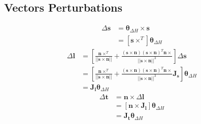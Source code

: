 \subsection{Vectors Perturbations}
\begin{equation}
    \begin{split}
        \Delta \mathbf{s} &= \boldsymbol{\theta}_{\Delta H} \times \mathbf{s}\\
        &= \left[\mathbf{s} \times ^T\right] \boldsymbol{\theta}_{\Delta H}
    \end{split}
\end{equation}
\begin{equation}
    \begin{split}
        \Delta \mathbf{l} &= \left[\frac{\mathbf{n}\times^T}{||\mathbf{s}\times\mathbf{n}||} + \frac{\left(\mathbf{s}\times\mathbf{n}\right)\left(\mathbf{s}\times\mathbf{n}\right)^T\mathbf{n}\times}{||\mathbf{s}\times\mathbf{n}||^3}\right] \Delta \mathbf{s}\\
        &= \left[\frac{\mathbf{n}\times^T}{||\mathbf{s}\times\mathbf{n}||} + \frac{\left(\mathbf{s}\times\mathbf{n}\right)\left(\mathbf{s}\times\mathbf{n}\right)^T\mathbf{n}\times}{||\mathbf{s}\times\mathbf{n}||^3} \mathbf{J}_\mathbf{s} \right] \boldsymbol{\theta}_{\Delta H}\\
        &= \mathbf{J}_\mathbf{l} \boldsymbol{\theta}_{\Delta H}
    \end{split}
\end{equation}
\begin{equation}
    \begin{split}
        \Delta \mathbf{t} &= \mathbf{n} \times \Delta \mathbf{l}\\
        &= \left[\mathbf{n} \times \mathbf{J}_\mathbf{l} \right]\boldsymbol{\theta}_{\Delta H}\\
        &= \mathbf{J}_\mathbf{t} \boldsymbol{\theta}_{\Delta H}
    \end{split}
\end{equation}
